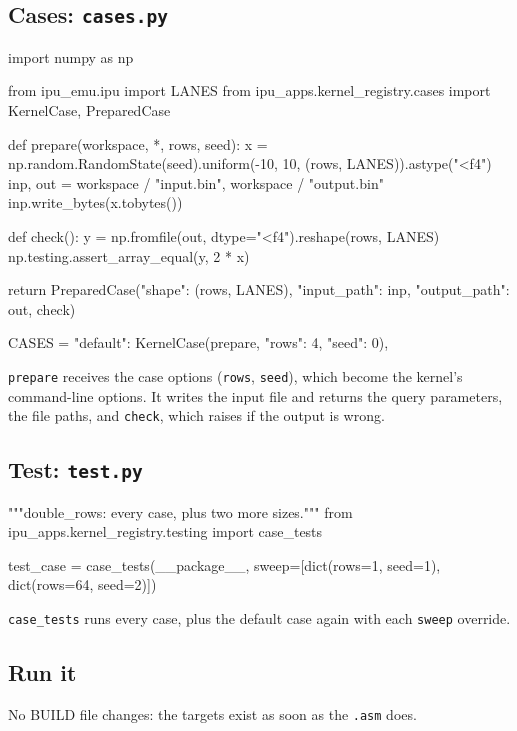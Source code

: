 \documentclass[11pt,a4paper]{article}
\begin{document}
\subsection{Cases: \texttt{cases.py}}

\begin{pycode}
import numpy as np

from ipu_emu.ipu import LANES
from ipu_apps.kernel_registry.cases import KernelCase, PreparedCase

def prepare(workspace, *, rows, seed):
    x = np.random.RandomState(seed).uniform(-10, 10, (rows, LANES)).astype("<f4")
    inp, out = workspace / "input.bin", workspace / "output.bin"
    inp.write_bytes(x.tobytes())

    def check():
        y = np.fromfile(out, dtype="<f4").reshape(rows, LANES)
        np.testing.assert_array_equal(y, 2 * x)

    return PreparedCase({"shape": (rows, LANES)},
                        {"input_path": inp, "output_path": out}, check)

CASES = {
    "default": KernelCase(prepare, {"rows": 4, "seed": 0}),
}
\end{pycode}

\texttt{prepare} receives the case options (\texttt{rows}, \texttt{seed}), which
become the kernel's command-line options. It writes the input file and returns
the query parameters, the file paths, and \texttt{check}, which raises if the
output is wrong.

\subsection{Test: \texttt{test.py}}

\begin{pycode}
"""double_rows: every case, plus two more sizes."""
from ipu_apps.kernel_registry.testing import case_tests

test_case = case_tests(__package__, sweep=[dict(rows=1, seed=1), dict(rows=64, seed=2)])
\end{pycode}

\texttt{case\_tests} runs every case, plus the default case again with each
\texttt{sweep} override.

\needspace{0.42\textheight}
\subsection{Run it}

No BUILD file changes: the targets exist as soon as the \texttt{.asm} does.
\end{document}
